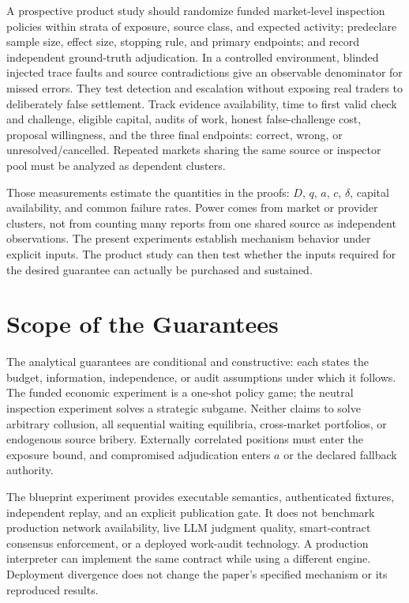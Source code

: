 \documentclass[10pt]{article}
\begin{document}
A prospective product study should randomize funded market-level inspection policies within strata of exposure, source class, and expected activity; predeclare sample size, effect size, stopping rule, and primary endpoints; and record independent ground-truth adjudication. In a controlled environment, blinded injected trace faults and source contradictions give an observable denominator for missed errors. They test detection and escalation without exposing real traders to deliberately false settlement. Track evidence availability, time to first valid check and challenge, eligible capital, audits of work, honest false-challenge cost, proposal willingness, and the three final endpoints: correct, wrong, or unresolved/cancelled. Repeated markets sharing the same source or inspector pool must be analyzed as dependent clusters.

Those measurements estimate the quantities in the proofs: $D$, $q$, $a$, $c$, $\delta$, capital availability, and common failure rates. Power comes from market or provider clusters, not from counting many reports from one shared source as independent observations. The present experiments establish mechanism behavior under explicit inputs. The product study can then test whether the inputs required for the desired guarantee can actually be purchased and sustained.

\section{Scope of the Guarantees}
\label{sec:boundaries}

The analytical guarantees are conditional and constructive: each states the budget, information, independence, or audit assumptions under which it follows. The funded economic experiment is a one-shot policy game; the neutral inspection experiment solves a strategic subgame. Neither claims to solve arbitrary collusion, all sequential waiting equilibria, cross-market portfolios, or endogenous source bribery. Externally correlated positions must enter the exposure bound, and compromised adjudication enters $a$ or the declared fallback authority.

The blueprint experiment provides executable semantics, authenticated fixtures, independent replay, and an explicit publication gate. It does not benchmark production network availability, live LLM judgment quality, smart-contract consensus enforcement, or a deployed work-audit technology. A production interpreter can implement the same contract while using a different engine. Deployment divergence does not change the paper's specified mechanism or its reproduced results.
\end{document}

